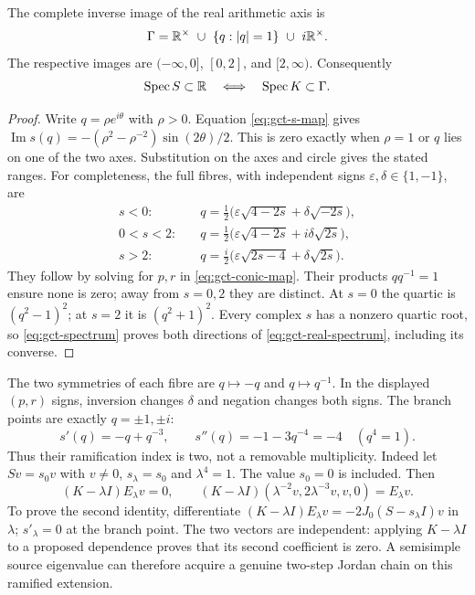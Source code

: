 \begin{proposition}\label{prop:gct-real-locus}
The complete inverse image of the real arithmetic axis is
\[
 \Gamma=\R^\times\ \cup\ \{q:|q|=1\}\ \cup\ i\R^\times.
\]
The respective images are $(-\infty,0]$, $[0,2]$, and $[2,\infty)$.
Consequently
\begin{equation}\label{eq:gct-real-spectrum}
 \operatorname{Spec}S\subset\mathbb R
 \quad\Longleftrightarrow\quad
 \operatorname{Spec}K\subset\Gamma.
\end{equation}
\end{proposition}
\begin{proof}
Write $q=\rho e^{i\theta}$ with $\rho>0$. Equation \eqref{eq:gct-s-map}
gives
$\operatorname{Im}s(q)=-(\rho^2-\rho^{-2})\sin(2\theta)/2$.
This is zero exactly when $\rho=1$ or $q$ lies on one of the two axes.
Substitution on the axes and circle gives the stated ranges.
For completeness, the full fibres, with independent signs
$\varepsilon,\delta\in\{1,-1\}$, are
\begin{align*}
 s<0:\quad&q=\tfrac12\bigl(\varepsilon\sqrt{4-2s}
                              +\delta\sqrt{-2s}\bigr),\\
 0<s<2:\quad&q=\tfrac12\bigl(\varepsilon\sqrt{4-2s}
                              +i\delta\sqrt{2s}\bigr),\\
 s>2:\quad&q=\tfrac i2\bigl(\varepsilon\sqrt{2s-4}
                              +\delta\sqrt{2s}\bigr).
\end{align*}
They follow by solving for $p,r$ in \eqref{eq:gct-conic-map}.
Their products $qq^{-1}=1$ ensure none is zero; away from $s=0,2$
they are distinct. At $s=0$ the quartic is $(q^2-1)^2$; at $s=2$
it is $(q^2+1)^2$. Every complex $s$ has a nonzero quartic root,
so \eqref{eq:gct-spectrum} proves both directions of
\eqref{eq:gct-real-spectrum}, including its converse.
\end{proof}

The two symmetries of each fibre are $q\mapsto-q$ and $q\mapsto q^{-1}$.
In the displayed $(p,r)$ signs, inversion changes $\delta$ and negation
changes both signs. The branch points are exactly $q=\pm1,\pm i$:
\[
 s'(q)=-q+q^{-3},\qquad s''(q)=-1-3q^{-4}=-4
 \quad(q^4=1).
\]
Thus their ramification index is two, not a removable multiplicity.
Indeed let $Sv=s_0v$ with $v\ne0$, $s_\lambda=s_0$ and
$\lambda^4=1$. The value $s_0=0$ is included. Then
\begin{equation}\label{eq:gct-Jordan}
 (K-\lambda I)E_\lambda v=0,\qquad
 (K-\lambda I)(\lambda^{-2}v,2\lambda^{-3}v,v,0)=E_\lambda v.
\end{equation}
To prove the second identity, differentiate
$(K-\lambda I)E_\lambda v=-2J_0(S-s_\lambda I)v$ in $\lambda$;
$s'_\lambda=0$ at the branch point. The two vectors are independent:
applying $K-\lambda I$ to a proposed dependence proves that its second
coefficient is zero. A semisimple source eigenvalue can therefore acquire
a genuine two-step Jordan chain on this ramified extension.

